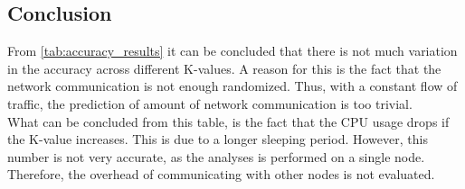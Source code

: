 \subsection{Conclusion} \label{sec:accuracy_conclusion}
From \autoref{tab:accuracy_results} it can be concluded that there is not much variation in the accuracy across different K-values. A reason for this is the fact that the network communication is not enough randomized. Thus, with a constant flow of traffic, the prediction of amount of network communication is too trivial.\\

\noindent
What can be concluded from this table, is the fact that the CPU usage drops if the K-value increases. This is due to a longer sleeping period. However, this number is not very accurate, as the analyses is performed on a single node. Therefore, the overhead of communicating with other nodes is not evaluated.